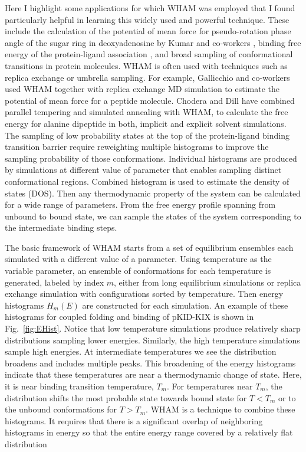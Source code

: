 \documentclass[../talant.diss.submit.tex]{subfiles}
\begin{document}
Here I highlight some applications for which WHAM was employed that I found particularly
helpful in learning this widely used and powerful technique. These include the calculation
of the potential of mean force for pseudo-rotation phase angle of the sugar ring
in deoxyadenosine by Kumar and co-workers \cite{kumarWHAM:92}, binding free energy
 of the protein-ligand association \cite{bouzida:99}, and broad sampling of conformational
transitions in protein molecules.\cite{whitford:09,wei:2013,huang:10a,zhang:12,ganguly:11a,trizac:10}
WHAM is often used with techniques such as replica exchange or
umbrella sampling.  For example, Gallicchio and co-workers \cite{gallicchio:05}
used WHAM together with replica exchange MD simulation to estimate the potential
of mean force for a peptide molecule. Chodera and Dill \cite{chodera:07} have
combined parallel tempering and simulated annealing with WHAM, to calculate the
free energy for alanine dipeptide in both, implicit and explicit solvent
simulations.  The sampling of low probability states at the top of the
protein-ligand binding transition barrier require reweighting multiple
histograms to improve the sampling probability of those conformations.
Individual histograms are produced by simulations at different value of
parameter that enables sampling distinct conformational regions. Combined
histogram is used to estimate the density of states (DOS). Then any
thermodynamic property of the system can be calculated for a wide range of
parameters. From the free energy profile spanning from unbound to bound state,
we can sample the states of the system corresponding to the intermediate binding
steps.

The basic framework of WHAM starts from a set of equilibrium ensembles each simulated with
a different value of a parameter.  Using temperature as
the variable parameter, an ensemble of conformations for each temperature is generated,
labeled by index $m$, either from long equilibrium simulations or replica
exchange simulation with configurations
sorted by temperature. Then  energy histograms $H_{m}(E)$ are constructed for each
simulation.  An example of these histograms for coupled folding and binding of
pKID-KIX is shown in Fig.~\ref{fig:EHist}. Notice that low temperature
simulations produce relatively sharp distributions sampling lower energies.
Similarly, the high temperature simulations sample high energies. At intermediate
temperatures we see the distribution broadens and includes multiple peaks. This
broadening of the energy histograms indicate that these temperatures are near a
thermodynamic change of state. Here, it is near binding transition temperature,
$T_m$.  For temperatures near $T_m$, the distribution shifts the most probable
state towards bound state for $T < T_m$ or to the unbound conformations for
$ T > T_m$.  WHAM is a technique to combine these histograms. It requires that
there is a significant overlap of neighboring histograms in energy so that the
entire energy range covered by a relatively flat distribution
\end{document}
